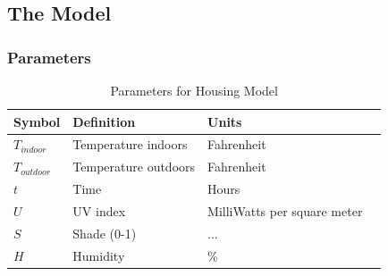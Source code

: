 \documentclass[12pt]{article}
\begin{document}
\subsection{The Model}
\subsubsection{Parameters}\label{params}
\begin{table}[H]
\centering
\begin{tabular}{|p{3cm}|p{7cm}|p{2cm}|p{2cm}|}
\hline
\bf Symbol & \bf Definition & \bf Units \\\hline
$T_{indoor}$ & Temperature indoors  & Fahrenheit \\\hline
$T_{outdoor}$ & Temperature outdoors & Fahrenheit   \\\hline
$t$ & Time & Hours \\\hline
$U$ & UV index & MilliWatts per square meter \\\hline
$S$ & Shade (0-1) & ... \\\hline
$H$ & Humidity & \% \\\hline
\end{tabular}
\caption{Parameters for Housing Model}
\end{table}
\end{document}
